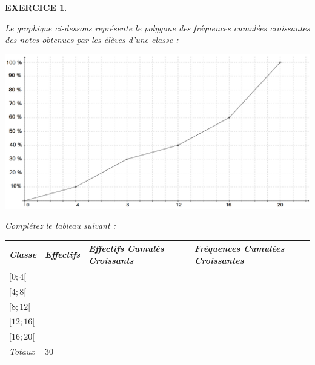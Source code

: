 \documentclass[a4paper]{article}   %
\renewcommand{\(}{\left(}
\renewcommand{\)}{\right)}
\newtheorem{EXO}{\large EXERCICE }
\newenvironment{EX}   { \setcounter{ques}{0} \begin{EXO} \hrulefill ~\vspace{0.3cm}

\normalfont}    {\end{EXO} \medskip}
\begin{document}
\setcounter{ques}{0}
\begin{EX} Le graphique ci-dessous représente le polygone des fréquences cumulées croissantes des notes obtenues par les élèves d'une classe :
~~\\
\begin{center}
\includegraphics[width=15cm]{9ex2.png}
\end{center}
Complétez le tableau suivant :
\begin{center}
\begin{tabular}{|p{2cm}| p{2cm}|p{5.5cm}| p{6cm}|}		%
\hline							%
Classe &Effectifs & Effectifs Cumulés Croissants & Fréquences Cumulées Croissantes \\
\hline
$[0;4[$&&&\\
\hline
$[4;8[$&&&\\
\hline
$[8;12[$&&&\\
\hline
$[12;16[$&&&\\
\hline
$[16;20[$&&&\\
\hline
Totaux&$30$&&\\
\hline
\end{tabular}
\end{center}
\end{EX}
\end{document}

